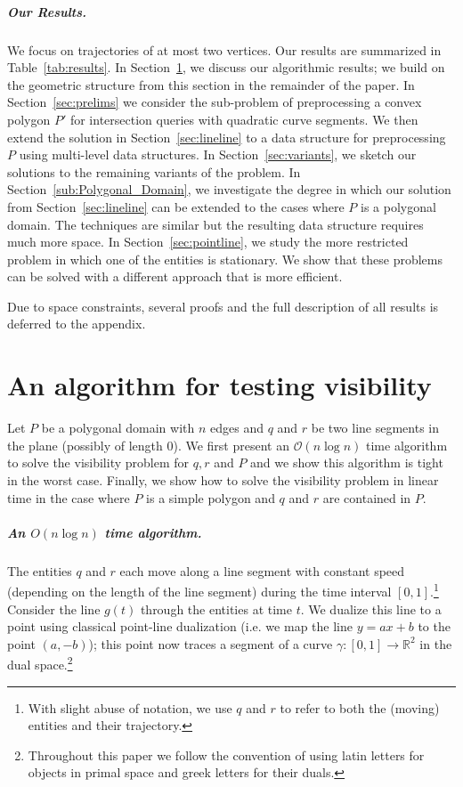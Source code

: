 \documentclass[UKenglish]{lipics-v2019}
\newcommand{\mkmcal}[1]{\ensuremath{\mathcal{#1}}\xspace}
\renewcommand{\O}{\mkmcal{O}}
\newcommand{\mkmbb}[1]{\ensuremath{\mathbb{#1}}\xspace}
\newcommand{\R}{\mkmbb{R}}
\begin{document}
\subparagraph {Our Results.}
  We focus on trajectories of at most two vertices.
  Our results are summarized in Table~\ref {tab:results}.
  In Section~\ref{sec:oneshots}, we discuss our algorithmic results; we build on the geometric structure from this section in the remainder of the paper.
  In Section~\ref{sec:prelims} we consider the sub-problem of preprocessing a convex polygon $P'$ for intersection queries with quadratic curve segments.
  We then extend the solution in Section~\ref{sec:lineline} to a data structure for preprocessing $P$ using multi-level data structures. 
  In Section~\ref{sec:variants}, we sketch our solutions to the remaining variants of the problem.
  In Section~\ref{sub:Polygonal_Domain}, we investigate the degree in which our solution from Section~\ref{sec:lineline} can be extended to the cases where $P$ is a polygonal domain. The techniques are similar but the resulting data structure requires much more space.
  In Section~\ref{sec:pointline}, we study the more restricted problem in which one of the entities is stationary. We show that these problems can be solved with a different approach that is more efficient.

  Due to space constraints, several proofs and the full description of all results is deferred to the appendix.

\section{An algorithm for testing visibility}
\label{sec:oneshots}

Let $P$ be a polygonal domain with $n$ edges and $q$ and $r$ be two line segments in the plane (possibly of length 0). We first present an $\O(n\log n)$ time algorithm to solve the visibility problem for $q,r$ and $P$ and we show this algorithm is tight in the worst case. Finally, we show how to solve the visibility problem in linear time in the case where $P$ is a simple polygon and $q$ and $r$ are contained in $P$.

\subparagraph{An $O(n \log n)$ time algorithm.}
The entities $q$ and $r$ each move along a line segment with constant speed (depending on the length of the line segment) during the time interval $[0,1]$.\footnote {With slight abuse of notation, we use $q$ and $r$ to refer to both the (moving) entities and their trajectory.}
Consider the line $g(t)$ through the entities at time $t$.
We dualize this line to a point using classical point-line dualization (i.e. we map the line $y = ax + b$ to the point $(a, -b)$); this point now traces a segment of a curve $\gamma : [0,1] \to \R^2$ in the dual space.\footnote {Throughout this paper we follow the convention of using latin letters for objects in primal space and greek letters for their duals.}
\end{document}

